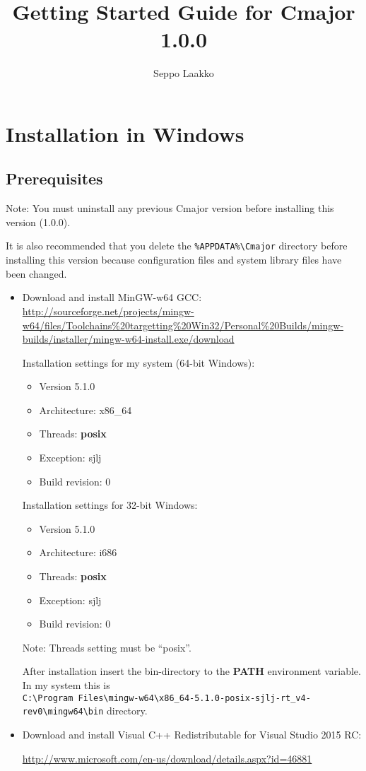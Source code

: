 \documentclass[oneside, a4paper, 11pt]{article}
\begin{document}
\title{Getting Started Guide for Cmajor 1.0.0}
\author{Seppo Laakko}
\maketitle

\section{Installation in Windows}

\subsection{Prerequisites}

Note:
You must uninstall any previous Cmajor version before installing
this version (1.0.0).

It is also recommended that you delete the
\verb|%APPDATA%\Cmajor| directory before installing
this version because configuration files and system library files
have been changed.

\begin{itemize}

\item
Download and install MinGW-w64 GCC:\\
\url{http://sourceforge.net/projects/mingw-w64/files/Toolchains%20targetting%20Win32/Personal%20Builds/mingw-builds/installer/mingw-w64-install.exe/download}

Installation settings for my system (64-bit Windows):
\begin{itemize}
\item
Version 5.1.0
\item
Architecture: x86\_64
\item
Threads: \textbf{posix}
\item
Exception: sjlj
\item
Build revision: 0
\end{itemize}

Installation settings for 32-bit Windows:
\begin{itemize}
\item
Version 5.1.0
\item
Architecture: i686
\item
Threads: \textbf{posix}
\item
Exception: sjlj
\item
Build revision: 0
\end{itemize}

Note: Threads setting must be ``posix''.

After installation insert the bin-directory to the \textbf{PATH} environment variable.
In my system this is\\
\verb|C:\Program Files\mingw-w64\x86_64-5.1.0-posix-sjlj-rt_v4-rev0\mingw64\bin| directory.

\item
Download and install Visual C++ Redistributable for Visual Studio 2015 RC:

\url{http://www.microsoft.com/en-us/download/details.aspx?id=46881}
\end{itemize}
\end{document}
